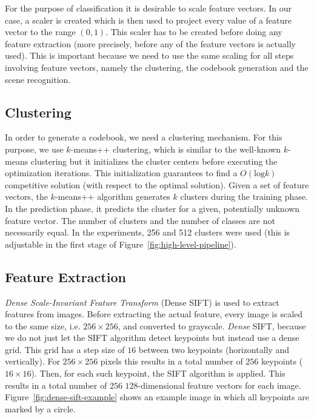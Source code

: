 \documentclass{vldb}
\begin{document}
For the purpose of classification it is desirable to scale feature vectors. In
our case, a scaler is created which is then used to project every value of a
feature vector to the range $(0, 1)$. This scaler has to be created before doing any
feature extraction (more precisely, before any of the feature vectors is actually
used). This is important because we need to use the same scaling for all steps
involving feature vectors, namely the clustering, the codebook generation
and the scene recognition.

\subsection{Clustering}
\label{subsec:clustering}

In order to generate a codebook, we need a clustering mechanism. For this
purpose, we use $k$-means++ clustering, which is similar to the well-known
$k$-means clustering but it initializes the cluster centers before executing the
optimization iterations. This initialization guarantees to find a
$O(\text{log} k)$ competitive solution (with respect to the optimal solution).
Given a set of feature vectors, the $k$-means++ algorithm generates $k$ clusters
during the training phase. In the prediction phase, it predicts the cluster for
a given, potentially unknown feature vector. The number of clusters and the number
of classes are not necessarily equal. In the experiments, 256 and 512 clusters
were used (this is adjustable in the first stage of
Figure~\ref{fig:high-level-pipeline}).

\subsection{Feature Extraction}
\label{subsec:feature-extraction}

\emph{Dense Scale-Invariant Feature Transform} (Dense SIFT) is used to extract
features from images. Before extracting the actual feature, every image is scaled
to the same size, i.e. $256\times256$, and converted to grayscale.
\emph{Dense} SIFT, because we do not just let the SIFT algorithm detect keypoints
but instead use a dense grid. This grid has a step size of $16$ between two
keypoints (horizontally and vertically). For $256\times256$ pixels this results
in a total number of $256$ keypoints ($16\times16$). Then, for each such keypoint,
the SIFT algorithm is applied. This results in a total number of $256$
$128$-dimensional feature vectors for each image.
Figure~\ref{fig:dense-sift-example} shows an example image in which all keypoints
are marked by a circle.
\end{document}

